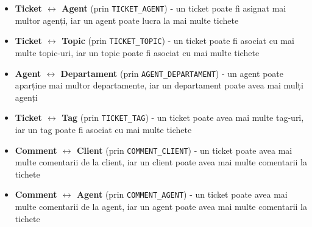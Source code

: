 \begin{itemize}
    \item \textbf{Ticket $\leftrightarrow$ Agent} (prin \texttt{TICKET\_AGENT}) - un ticket poate fi asignat mai multor agenți, iar un agent poate lucra la mai multe tichete
    \item \textbf{Ticket $\leftrightarrow$ Topic} (prin \texttt{TICKET\_TOPIC}) - un ticket poate fi asociat cu mai multe topic-uri, iar un topic poate fi asociat cu mai multe tichete
    \item \textbf{Agent $\leftrightarrow$ Departament} (prin \texttt{AGENT\_DEPARTAMENT}) - un agent poate aparține mai multor departamente, iar un departament poate avea mai mulți agenți
    \item \textbf{Ticket $\leftrightarrow$ Tag} (prin \texttt{TICKET\_TAG}) - un ticket poate avea mai multe tag-uri, iar un tag poate fi asociat cu mai multe tichete
    \item \textbf{Comment $\leftrightarrow$ Client} (prin \texttt{COMMENT\_CLIENT}) - un ticket poate avea mai multe comentarii de la client, iar un client poate avea mai multe comentarii la tichete
    \item \textbf{Comment $\leftrightarrow$ Agent} (prin \texttt{COMMENT\_AGENT}) - un ticket poate avea mai multe comentarii de la agent, iar un agent poate avea mai multe comentarii la tichete
\end{itemize}
